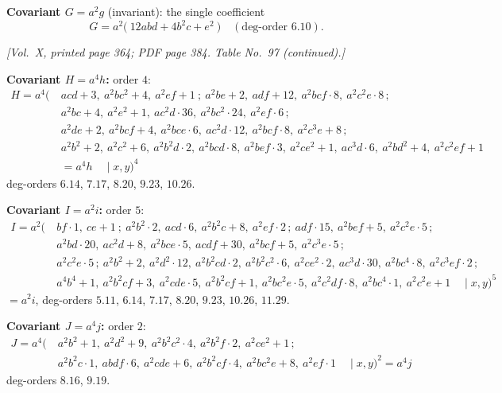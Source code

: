 \documentclass[11pt]{article}
\begin{document}
\medskip

\noindent\textbf{Covariant $G=a^{2}g$} (invariant): the single coefficient
\[
G=a^{2}\bigl(\ 12abd+4b^{2}c+e^{2}\ \bigr)\quad(\text{deg-order } 6.10).
\]

\newpage

\noindent\textit{[Vol.~X, printed page 364; PDF page 384. Table No.~97 (continued).]}

\medskip

\noindent\textbf{Covariant $H=a^{4}h$:} order $4$:
\begin{align*}
H=a^{4}\bigl(\ &acd+3,\ a^{2}bc^{2}+4,\ a^{2}ef+1\ ;\ a^{2}be+2,\ adf+12,\ a^{2}bcf\cdot 8,\ a^{2}c^{2}e\cdot 8\,;\\
 &a^{2}bc+4,\ a^{2}e^{2}+1,\ ac^{2}d\cdot 36,\ a^{2}bc^{2}\cdot 24,\ a^{2}ef\cdot 6\,;\\
 &a^{2}de+2,\ a^{2}bcf+4,\ a^{2}bce\cdot 6,\ ac^{2}d\cdot 12,\ a^{2}bcf\cdot 8,\ a^{2}c^{3}e+8\,;\\
 &a^{2}b^{2}+2,\ a^{2}c^{2}+6,\ a^{2}b^{2}d\cdot 2,\ a^{2}bcd\cdot 8,\ a^{2}bef\cdot 3,\ a^{2}ce^{2}+1,\ ac^{3}d\cdot 6,\ a^{2}bd^{2}+4,\ a^{2}c^{2}ef+1\\
 &=a^{4}h\quad\mid x,y\bigr)^{4}
\end{align*}
deg-orders $6.14$, $7.17$, $8.20$, $9.23$, $10.26$.

\medskip

\noindent\textbf{Covariant $I=a^{2}i$:} order $5$:
\begin{align*}
I=a^{2}\bigl(\ &bf\cdot 1,\ ce+1\ ;\ a^{2}b^{2}\cdot 2,\ acd\cdot 6,\ a^{2}b^{2}c+8,\ a^{2}ef\cdot 2\,;\ adf\cdot 15,\ a^{2}bef+5,\ a^{2}c^{2}e\cdot 5\,;\\
 &a^{2}bd\cdot 20,\ ac^{2}d+8,\ a^{2}bce\cdot 5,\ acdf+30,\ a^{2}bcf+5,\ a^{2}c^{3}e\cdot 5\,;\\
 &a^{2}c^{2}e\cdot 5\,;\ a^{2}b^{2}+2,\ a^{2}d^{2}\cdot 12,\ a^{2}b^{2}cd\cdot 2,\ a^{2}b^{2}c^{2}\cdot 6,\ a^{2}ce^{2}\cdot 2,\ ac^{3}d\cdot 30,\ a^{2}bc^{4}\cdot 8,\ a^{2}c^{3}ef\cdot 2\,;\\
 &a^{4}b^{4}+1,\ a^{2}b^{2}cf+3,\ a^{2}cde\cdot 5,\ a^{2}b^{2}cf+1,\ a^{2}bc^{2}e\cdot 5,\ a^{2}c^{2}df\cdot 8,\ a^{2}bc^{4}\cdot 1,\ a^{2}c^{2}e+1\quad\mid x,y\bigr)^{5}
\end{align*}
$=a^{2}i$, deg-orders $5.11$, $6.14$, $7.17$, $8.20$, $9.23$, $10.26$, $11.29$.

\medskip

\noindent\textbf{Covariant $J=a^{4}j$:} order $2$:
\begin{align*}
J=a^{4}\bigl(\ &a^{2}b^{2}+1,\ a^{2}d^{2}+9,\ a^{2}b^{2}c^{2}\cdot 4,\ a^{2}b^{2}f\cdot 2,\ a^{2}ce^{2}+1\,;\\
 &a^{2}b^{2}c\cdot 1,\ abdf\cdot 6,\ a^{2}cde+6,\ a^{2}b^{2}cf\cdot 4,\ a^{2}bc^{2}e+8,\ a^{2}ef\cdot 1\quad\mid x,y\bigr)^{2} = a^{4}j
\end{align*}
deg-orders $8.16$, $9.19$.
\end{document}
